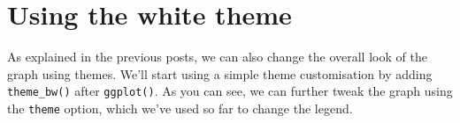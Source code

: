 \section{Using the white theme}\label{using-the-white-theme}

As explained in the previous posts, we can also change the overall look
of the graph using themes. We'll start using a simple theme
customisation by adding \texttt{theme\_bw()} after \texttt{ggplot()}. As
you can see, we can further tweak the graph using the \texttt{theme}
option, which we've used so far to change the legend.

\begin{Shaded}
\begin{Highlighting}[]
\StringTok{ }\NormalTok{() +}
\StringTok{  }\NormalTok{(}\NormalTok{(}    
    \NormalTok{) +}\StringTok{ }
\StringTok{  }\NormalTok{(}\NormalTok{(}   \NormalTok{), }
     \StringTok{ }
\StringTok{  }\NormalTok{(}\NormalTok{(}\NormalTok{,}\NormalTok{,}\NormalTok{)) +}\StringTok{ }
\StringTok{  }\NormalTok{(}\NormalTok{, }\NormalTok{) +}\StringTok{ }
\StringTok{  }\NormalTok{(}\NormalTok{) +}\StringTok{ }
\StringTok{  }\NormalTok{(}
\StringTok{  }\NormalTok{() +}
\StringTok{  }\NormalTok{(}\NormalTok{, }
    \NormalTok{, }
     \NormalTok{())   }
\end{Highlighting}
\end{Shaded}

